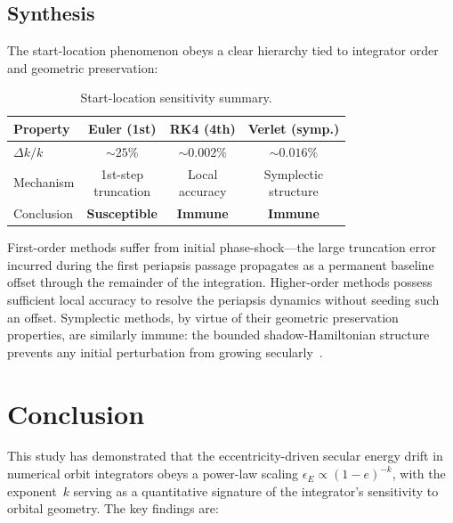 \documentclass[twocolumn, 10pt]{article}
\begin{document}
\subsection{Synthesis}

The start-location phenomenon obeys a clear hierarchy tied to integrator order and geometric preservation:

\begin{table}[H]
\centering
\caption{Start-location sensitivity summary.}
\label{tab:start_location}
\begin{tabular}{@{}lccc@{}}
\toprule
Property & Euler (1st) & RK4 (4th) & Verlet (symp.) \\
\midrule
$\Delta k / k$ & ${\sim}25\%$ & ${\sim}0.002\%$ & ${\sim}0.016\%$ \\
Mechanism & \parbox{2cm}{\centering 1st-step \\ truncation} & \parbox{2cm}{\centering Local \\ accuracy} & \parbox{2cm}{\centering Symplectic \\ structure} \\
Conclusion & \textbf{Susceptible} & \textbf{Immune} & \textbf{Immune} \\
\bottomrule
\end{tabular}
\end{table}

First-order methods suffer from initial phase-shock---the large truncation error incurred during the first periapsis passage propagates as a permanent baseline offset through the remainder of the integration. Higher-order methods possess sufficient local accuracy to resolve the periapsis dynamics without seeding such an offset. Symplectic methods, by virtue of their geometric preservation properties, are similarly immune: the bounded shadow-Hamiltonian structure prevents any initial perturbation from growing secularly~\cite{rein2019}.

\section{Conclusion}

This study has demonstrated that the eccentricity-driven secular energy drift in numerical orbit integrators obeys a power-law scaling $\epsilon_E \propto (1-e)^{-k}$, with the exponent~$k$ serving as a quantitative signature of the integrator's sensitivity to orbital geometry. The key findings are:
\end{document}
